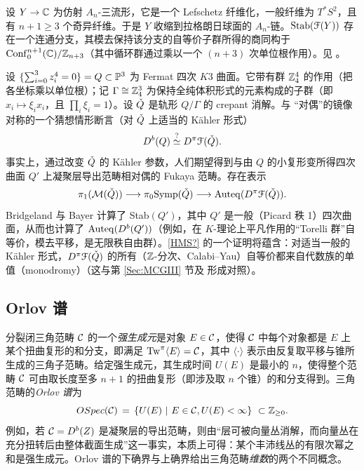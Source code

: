 
\begin{Example} 
设 $Y \rightarrow \mathbb{C}$ 为仿射 $A_n$-三流形，它是一个 Lefschetz 纤维化，一般纤维为 $T^*S^2$，且有 $n+1 \geq 3$ 个奇异纤维。于是 $Y$ 收缩到拉格朗日球面的 $A_n$-链。$\mathrm{Stab}(\EuScript{F}(Y))$ 存在一个连通分支，其模去保持该分支的自等价子群所得的商同构于 $\mathrm{Conf}_0^{n+1}(\mathbb{C}) / \mathbb{Z}_{n+3}$（其中循环群通过乘以一个 $(n+3)$ 次单位根作用）。见 \cite{BridgelandSmith}。\end{Example}

设 $\{\sum_{i=0}^3 z_i^4 = 0\} = Q\subset \mathbb{P}^3$ 为 Fermat 四次 $K3$ 曲面。它带有群 $\mathbb{Z}_4^4$ 的作用（把各坐标乘以单位根）；记 $\Gamma \cong \mathbb{Z}_4^3$ 为保持全纯体积形式的元素构成的子群（即 $x_i \mapsto \xi_i x_i$，且 $\prod_i \xi_i = 1$）。设 $\check{Q}$ 是轨形 $Q / \Gamma$ 的 crepant 消解。与 \cite{Seidel:HMSquartic} “对偶”的镜像对称的一个猜想情形断言（对 $\check{Q}$ 上适当的 Kähler 形式）
\begin{equation} \label{HMS?}
D^{b}(Q) \stackrel{?}{\simeq} D^{\pi}\EuScript{F}(\check{Q}).
\end{equation}
事实上，通过改变 $\check{Q}$ 的 Kähler 参数，人们期望得到与由 $Q$ 的小复形变所得四次曲面 $Q'$ 上凝聚层导出范畴相对偶的 Fukaya 范畴。存在表示
\[
\pi_1(\mathcal{M}(\check{Q})) \longrightarrow \pi_0\mathrm{Symp}(\check{Q}) \longrightarrow \mathrm{Auteq}(D^{\pi}\EuScript{F}(\check{Q})).
\]
Bridgeland 与 Bayer \cite{Bridgeland:K3, BayerBridgeland} 计算了 Stab$(Q')$，其中 $Q'$ 是一般（Picard 秩 1）四次曲面，从而也计算了 $\mathrm{Auteq}(D^b(Q'))$（例如，在 $K$-理论上平凡作用的“Torelli 群”自等价，模去平移，是无限秩自由群）。\eqref{HMS?} 的一个证明将蕴含：对适当一般的 Kähler 形式，$D^{\pi} \EuScript{F}(\check{Q})$ 的所有（$\mathbb{Z}$-分次、Calabi--Yau）自等价都来自代数族的单值（monodromy）（这与第 \ref{Sec:MCGIII} 节及 \cite{Smith:HFQuadrics} 形成对照）。

\subsection{Orlov 谱} 分裂闭三角范畴 $\mathcal{C}$ 的一个\emph{强生成元}是对象 $E \in \mathcal{C}$，使得 $\mathcal{C}$ 中每个对象都是 $E$ 上某个扭曲复形的和分支，即满足 $\operatorname{Tw}^{\pi}\langle E\rangle = \mathcal{C}$，其中 $\langle \cdot \rangle$ 表示由反复取平移与锥所生成的三角子范畴。给定强生成元，其生成时间 $U(E)$ 是最小的 $n$，使得整个范畴 $\mathcal{C}$ 可由取长度至多 $n+1$ 的扭曲复形（即涉及取 $n$ 个锥）的和分支得到。三角范畴的\emph{Orlov 谱}为
\[
OSpec(\mathcal{C}) \, = \, \left\{U(E) \ | \ E \in \mathcal{C}, U(E) < \infty \right\} \ \subset \mathbb{Z}_{\geq 0}.
\]
例如，若 $\mathcal{C} = D^b(Z)$ 是凝聚层的导出范畴，则由“层可被向量丛消解，而向量丛在充分扭转后由整体截面生成”这一事实，本质上可得：某个丰沛线丛的有限次幂之和是强生成元。Orlov 谱的下确界与上确界给出三角范畴\emph{维数}的两个不同概念。

